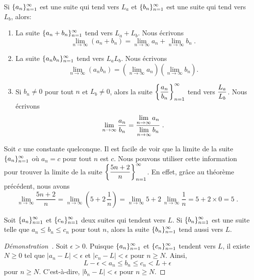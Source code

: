 {\begin{theorem} \label{suite3}
Si $\displaystyle \{ a_n\}_{n=1}^\infty$ est une suite qui tend vers
$L_a$ et $\displaystyle \{ b_n\}_{n=1}^\infty$ est une suite qui tend
vers $L_b$, alors:
\begin{enumerate}
\item La suite $\displaystyle \{ a_n + b_n \}_{n=1}^\infty$ tend vers
$L_a + L_b$.  Nous écrivons
\[
\lim_{n\rightarrow \infty} (a_n + b_n) =
\lim_{n\rightarrow \infty} a_n + \lim_{n\rightarrow \infty} b_n \; .
\]
\item La suite $\displaystyle \{ a_n b_n \}_{n=1}^\infty$ tend vers
$L_a L_b$.  Nous écrivons
\[
\lim_{n\rightarrow \infty} (a_n b_n) =
\left(\lim_{n\rightarrow \infty} a_n \right)
\left(\lim_{n\rightarrow \infty} b_n \right) .
\]
\item Si $b_n \neq 0$ pour tout $n$ et $L_b\neq 0$, alors la suite
$\displaystyle \left\{ \frac{a_n}{b_n} \right\}_{n=1}^\infty$
tend vers $\displaystyle \frac{L_a}{L_b}$.  Nous écrivons
\[
\lim_{n\rightarrow \infty} \frac{a_n}{b_n} =
\frac{\displaystyle \lim_{n\rightarrow \infty} a_n}
{\displaystyle \lim_{n\rightarrow \infty} b_n} \; .
\]
\end{enumerate}
\end{theorem}

\begin{egg}
Soit $c$ une constante quelconque.  Il est facile de voir que la
limite de la suite $\displaystyle \{ a_n\}_{n=1}^\infty$ où $a_n = c$
pour tout $n$ est $c$.  Nous pouvons utiliser cette information pour
trouver la limite de la suite
$\displaystyle \left\{ \frac{5n+2}{n} \right\}_{n=1}^\infty$.  En
effet, grâce au théorème précédent, nous avons
\[
\lim_{n\rightarrow \infty} \frac{5n+2}{n}
= \lim_{n\rightarrow \infty} \left(5 + 2\,\frac{1}{n} \right)
= \lim_{n\rightarrow \infty} 5 + 2\,\lim_{n\rightarrow \infty}\frac{1}{n}
= 5 + 2 \times 0 = 5 \; .
\]
\end{egg}

\begin{theorem} \label{gendarmeS}
 
Soit
$\displaystyle \{ a_n\}_{n=1}^\infty$ et $\displaystyle \{c_n\}_{n=1}^\infty$
deux suites qui tendent vers $L$.  Si
$\displaystyle \{ b_n\}_{n=1}^\infty$ est une suite telle que 
$a_n \leq b_n \leq c_n$ pour tout $n$, alors la
suite $\displaystyle \{ b_n\}_{n=1}^\infty$ tend aussi vers $L$.
\end{theorem}

\begin{proof}[Démonstration\ \theory]
Soit $\epsilon>0$.  Puisque $\displaystyle \{ a_n\}_{n=1}^\infty$ et
$\displaystyle \{c_n\}_{n=1}^\infty$ tendent vers $L$, il existe $N\geq 0$
tel que $|a_n-L|<\epsilon$ et $|c_n - L|<\epsilon$ pour $n\geq N$.  Ainsi,
\[
L-\epsilon < a_n \leq b_n \leq c_n < L+\epsilon
\]
pour $n\geq N$.  C'est-à-dire, $|b_n-L|<\epsilon$ pour $n\geq N$.
\end{proof}

}
